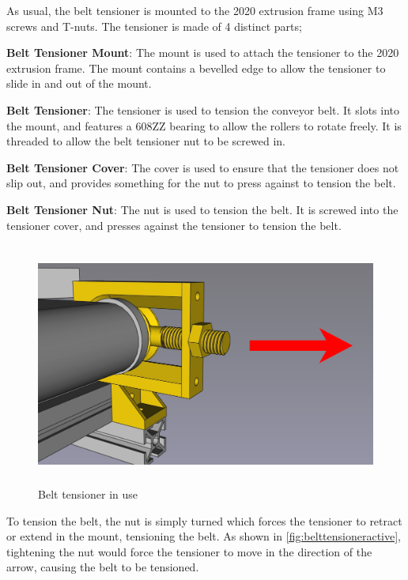 As usual, the belt tensioner is mounted to the 2020 extrusion frame using M3 screws and T-nuts. The tensioner is made of 4 distinct parts;
\begin{mylist}
    \item \textbf{Belt Tensioner Mount}: The mount is used to attach the tensioner to the 2020 extrusion frame. The mount contains a bevelled edge to allow the tensioner to slide in and out of the mount.
    \item \textbf{Belt Tensioner}: The tensioner is used to tension the conveyor belt. It slots into the mount, and features a 608ZZ bearing to allow the rollers to rotate freely. It is threaded to allow the belt tensioner nut to be screwed in.
    \item \textbf{Belt Tensioner Cover}: The cover is used to ensure that the tensioner does not slip out, and provides something for the nut to press against to tension the belt.
    \item \textbf{Belt Tensioner Nut}: The nut is used to tension the belt. It is screwed into the tensioner cover, and presses against the tensioner to tension the belt.
\end{mylist}

\begin{figure}[H]
    \begin{minipage}[h]{0.95\textwidth}
        \centering
        \includegraphics[height=8cm]{imgs/freecad/tensionerapplication.jpg}
        \caption{Belt tensioner in use}
        \label{fig:belttensioneractive}
    \end{minipage}
\end{figure}

To tension the belt, the nut is simply turned which forces the tensioner to retract or extend in the mount, tensioning the belt. As shown in \autoref{fig:belttensioneractive}, tightening the nut would force the tensioner to move in the direction of the arrow, causing the belt to be tensioned.

